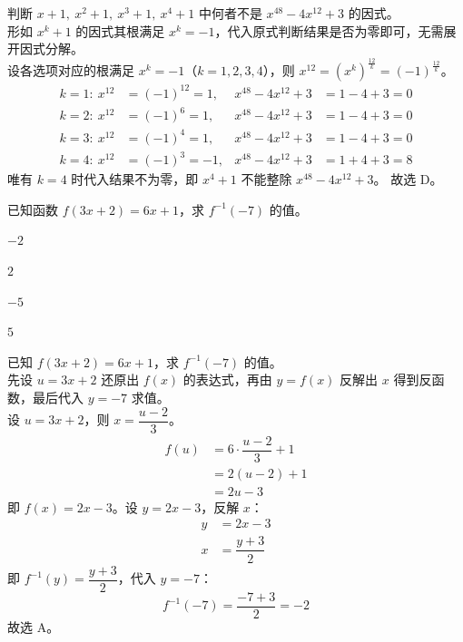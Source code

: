 \documentclass[12pt,a4paper]{exam-zh}
\begin{document}
\begin{solution}
    判断 $x+1,\ x^2+1,\ x^3+1,\ x^4+1$ 中何者不是 $x^{48}-4x^{12}+3$ 的因式。\\
    形如 $x^k+1$ 的因式其根满足 $x^k=-1$，代入原式判断结果是否为零即可，无需展开因式分解。\\
    设各选项对应的根满足 $x^k=-1$（$k=1,2,3,4$），则 $x^{12}=(x^k)^{\frac{12}{k}}=(-1)^{\frac{12}{k}}$。
    \begin{align*}
        k=1:\ x^{12}&=(-1)^{12}=1, &x^{48}-4x^{12}+3 &= 1-4+3=0 \\
        k=2:\ x^{12}&=(-1)^{6}=1, &x^{48}-4x^{12}+3 &= 1-4+3=0 \\
        k=3:\ x^{12}&=(-1)^{4}=1, &x^{48}-4x^{12}+3 &= 1-4+3=0 \\
        k=4:\ x^{12}&=(-1)^{3}=-1, &x^{48}-4x^{12}+3 &= 1+4+3=8
    \end{align*}
    唯有 $k=4$ 时代入结果不为零，即 $x^4+1$ 不能整除 $x^{48}-4x^{12}+3$。
    故选 D。
\end{solution}

\begin{question}
    已知函数 $f(3x+2)=6x+1$，求 $f^{-1}(-7)$ 的值。 \paren[A]
    \begin{choices}
        \item $-2$
        \item $2$
        \item $-5$
        \item $5$
    \end{choices}
\end{question}

\begin{solution}
    已知 $f(3x+2)=6x+1$，求 $f^{-1}(-7)$ 的值。\\
    先设 $u=3x+2$ 还原出 $f(x)$ 的表达式，再由 $y=f(x)$ 反解出 $x$ 得到反函数，最后代入 $y=-7$ 求值。\\
    设 $u=3x+2$，则 $x=\dfrac{u-2}{3}$。
    \begin{align*}
        f(u) &= 6\cdot\dfrac{u-2}{3}+1 \\
        &= 2(u-2)+1 \\
        &= 2u-3
    \end{align*}
    即 $f(x)=2x-3$。设 $y=2x-3$，反解 $x$：
    \begin{align*}
        y &= 2x-3 \\
        x &= \dfrac{y+3}{2}
    \end{align*}
    即 $f^{-1}(y)=\dfrac{y+3}{2}$，代入 $y=-7$：
    \[
        f^{-1}(-7) = \dfrac{-7+3}{2} = -2
    \]
    故选 A。
\end{solution}
\end{document}
